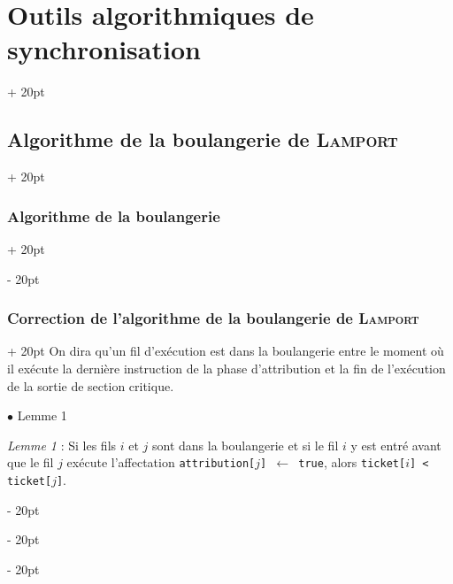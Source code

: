 \documentclass[a4paper, 12pt, twoside]{article}
\newcommand{\ind}[1][20pt]{\advance\leftskip + #1}
\newcommand{\deind}[1][20pt]{\advance\leftskip - #1}
\newenvironment{indt}[2][20pt]{#2 \par \ind[#1]}{\par \deind} %
\begin{document}
\begin{indt}{\section{Outils algorithmiques de synchronisation}}
\begin{indt}{\subsection{Algorithme de la boulangerie de \textsc{Lamport}}}
\begin{indt}{\subsubsection{Algorithme de la boulangerie}}




            \end{indt}

            \vspace{12pt}
            
            \begin{indt}{\subsubsection{Correction de l'algorithme de la boulangerie de \textsc{Lamport}}}
                On dira qu'un fil d'exécution est dans la boulangerie entre le moment où il exécute la dernière instruction de la phase d'attribution et la fin de l'exécution de la sortie de section critique.

                $\bullet$ Lemme 1

                \begin{emphBox}
                    \textit{Lemme 1} : Si les fils $i$ et $j$ sont dans la boulangerie et si le fil $i$ y est entré avant que le fil $j$ exécute l'affectation \texttt{attribution[$j$] $\leftarrow$ true}, alors \texttt{ticket[$i$] < ticket[$j$]}.
                \end{emphBox}


\end{indt}
\end{indt}
\end{indt}
\end{document}
